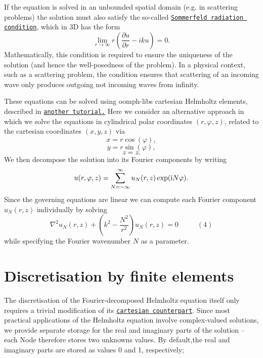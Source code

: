 If the equation is solved in an unbounded spatial domain (e.\+g. in scattering problems) the solution must also satisfy the so-\/called \href{http://en.wikipedia.org/wiki/Sommerfeld_radiation_condition}{\tt Sommerfeld radiation condition}, which in 3D has the form \[ \lim_{r\to \infty} r \left(\frac{\partial u}{\partial r} - iku \right) =0. \] Mathematically, this condition is required to ensure the uniqueness of the solution (and hence the well-\/posedness of the problem). In a physical context, such as a scattering problem, the condition ensures that scattering of an incoming wave only produces outgoing not incoming waves from infinity.

These equations can be solved using {\ttfamily oomph-\/lib\textquotesingle{}s} cartesian Helmholtz elements, described in \href{../../../helmholtz/scattering/html/index.html}{\tt another tutorial.} Here we consider an alternative approach in which we solve the equations in cylindrical polar coordinates $ (r,\varphi,z) $, related to the cartesian coordinates $ (x,y,z) $ via \[ x = r \cos(\varphi), \] \[ y = r \sin(\varphi), \] \[ z = z. \] We then decompose the solution into its Fourier components by writing \[ u(r,\varphi,z) = \sum_{N=-\infty}^{\infty} u_N(r,z) \exp({\rm i} N \varphi). \] Since the governing equations are linear we can compute each Fourier component $ u_N(r,z) $ individually by solving \[ \nabla^2 {u_{N}}(r,z) + \left(k^2-\frac{N^2}{r^2}\right) u_N(r,z) = 0 \ \ \ \ \ \ \ \ \ \ \ \ (4) \] while specifying the Fourier wavenumber $ N $ as a parameter.



\hypertarget{index_discr}{}\section{Discretisation by finite elements}\label{index_discr}
The discretisation of the Fourier-\/decomposed Helmholtz equation itself only requires a trivial modification of its \href{../../../helmholtz/scattering/html/index.html}{\tt cartesian counterpart}. Since most practical applications of the Helmholtz equation involve complex-\/valued solutions, we provide separate storage for the real and imaginary parts of the solution -- each {\ttfamily Node} therefore stores two unknowns values. By default,the real and imaginary parts are stored as values 0 and 1, respectively;

